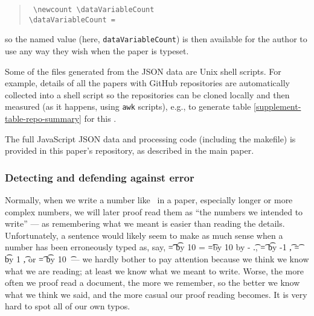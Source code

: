 \documentclass[10pt,a4paper]{article}
\begin{document}
\begin{verse}\tt
\textbackslash newcount \textbackslash dataVariableCount \\
\textbackslash dataVariableCount = \the\dataVariableCount
\end{verse}

so the named value (here, \texttt{dataVariableCount}) is then available for the author to use any way they wish when the paper is typeset.

Some of the files generated from the JSON data are Unix shell scripts. For example, details of all the papers with GitHub repositories are automatically collected into a shell script so the repositories can be cloned locally and then measured (as it happens, using \texttt{awk} scripts), e.g., to generate table \ref{supplement-table-repo-summary} for this \supplement.

The full JavaScript JSON data and processing code (including the makefile) is provided in this paper's repository, as described in the main paper.

\subsubsection{Detecting and defending against error}
\label{supplement-detecting-against-error}

Normally, when we write a number like \the\countUsesVersionControlRepository\ in a paper, especially longer or more complex numbers, we will later proof read them as ``the numbers we intended to write'' --- as remembering what we meant is easier than reading the details. Unfortunately, a sentence would likely seem to make as much sense when a number has been erroneously typed as, say,
\newcount\t
\t=\countUsesVersionControlRepository
\divide \t by 10
\newcount\fraction
\fraction=\countUsesVersionControlRepository
\newcount\tent \tent=\t \multiply \tent by 10
\advance\fraction by -\tent
\the\t.\the\fraction,
\t=\countUsesVersionControlRepository
\advance \t by -1
\the\t,
\t=\countUsesVersionControlRepository
\advance \t by 1
\the\t, or
\t=\countUsesVersionControlRepository
\multiply \t by 10
\the\t\ --- we hardly bother to pay attention because we think we know what we are reading; at least we know what we meant to write. Worse, the more often we proof read a document, the more we remember, so the better we know what we think we said, and the more casual our proof reading becomes. It is very hard to spot all of our own typos. 
\end{document}
